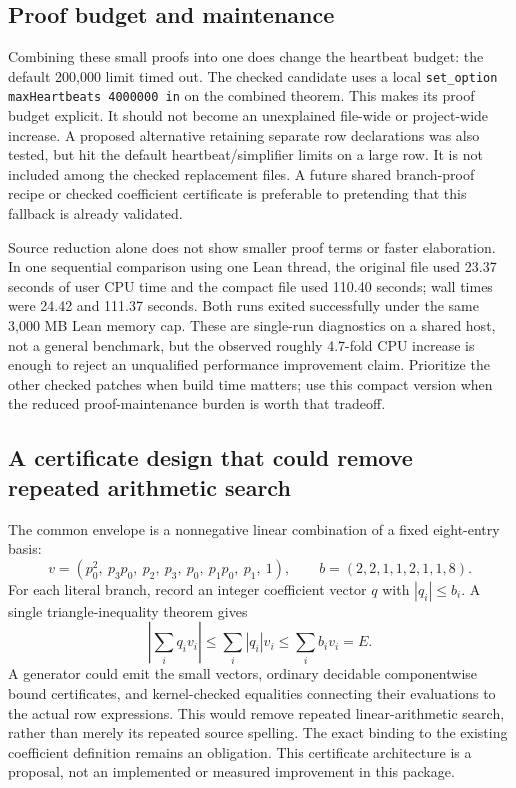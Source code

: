 \documentclass[11pt,letterpaper]{article}
\begin{document}
\subsection{Proof budget and maintenance}

Combining these small proofs into one does change the heartbeat budget: the default 200,000 limit timed out. The checked candidate uses a local \texttt{set\_option maxHeartbeats 4000000 in} on the combined theorem. This makes its proof budget explicit. It should not become
an unexplained file-wide or project-wide increase. A proposed alternative retaining separate row declarations was also tested, but hit the default heartbeat/simplifier limits on a large row. It is not included among the checked replacement files. A future shared branch-proof recipe or checked coefficient certificate is preferable to pretending that this fallback is already validated.

Source reduction alone does not show smaller proof terms or faster elaboration. In one sequential comparison using one Lean thread, the original file used 23.37 seconds of user CPU time and the compact file used 110.40 seconds; wall times were 24.42 and 111.37 seconds. Both runs exited successfully under the same 3,000 MB Lean memory cap. These are single-run diagnostics on a shared host, not a general benchmark, but the observed roughly 4.7-fold CPU increase is enough to reject an unqualified performance improvement claim. Prioritize the other checked patches when build time matters; use this compact version when the reduced proof-maintenance burden is worth that tradeoff.

\subsection{A certificate design that could remove repeated arithmetic search}

The common envelope is a nonnegative linear combination of a fixed eight-entry basis:
\[
 v=(p_0^2,\ p_3p_0,\ p_2,\ p_3,\ p_0,\ p_1p_0,\ p_1,\ 1),
 \qquad b=(2,2,1,1,2,1,1,8).
\]
For each literal branch, record an integer coefficient vector $q$ with
$|q_i|\leq b_i$. A single triangle-inequality theorem gives
\[
 \left|\sum_i q_i v_i\right|\leq\sum_i |q_i|v_i
 \leq\sum_i b_i v_i=E.
\]
A generator could emit the small vectors, ordinary decidable componentwise
bound certificates, and kernel-checked equalities connecting their
evaluations to the actual row expressions. This would remove repeated
linear-arithmetic search, rather than merely its repeated source spelling.
The exact binding to the existing coefficient definition remains an
obligation. This certificate architecture is a proposal, not an implemented
or measured improvement in this package.
\end{document}
